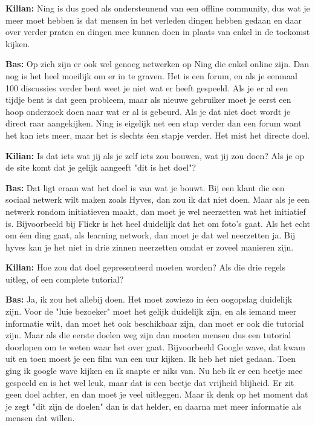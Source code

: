 \textbf{Kilian:} Ning is dus goed als ondersteunend van een offline community, dus wat je meer moet hebben is dat mensen in het verleden dingen hebben gedaan en daar over verder praten en dingen mee kunnen doen in plaats van enkel in de toekomst kijken.

\textbf{Bas:} Op zich zijn er ook wel genoeg netwerken op Ning die enkel online zijn. Dan nog is het heel moeilijk om er in te graven. Het is een forum, en als je eenmaal 100 discussies verder bent weet je niet wat er heeft gespeeld. Als je er al een tijdje bent is dat geen probleem, maar als nieuwe gebruiker moet je eerst een hoop onderzoek doen naar wat er al is gebeurd. Als je dat niet doet wordt je direct raar aangekijken. Ning is eigelijk net een stap verder dan een forum want het kan iets meer, maar het is slechts éen stapje verder. Het mist het directe doel.

\textbf{Kilian:} Is dat iets wat jij als je zelf iets zou bouwen, wat jij zou doen? Als je op de site komt dat je gelijk aangeeft "dit is het doel"?

\textbf{Bas:} Dat ligt eraan wat het doel is van wat je bouwt. Bij een klant die een sociaal netwerk wilt maken zoals Hyves, dan zou ik dat niet doen. Maar als je een netwerk rondom initiatieven maakt, dan moet je wel neerzetten wat het initiatief is. Bijvoorbeeld bij Flickr is het heel duidelijk dat het om foto's gaat. Als het echt om éen ding gaat, als learning network, dan moet je dat wel neerzetten ja. Bij hyves kan je het niet in drie zinnen neerzetten omdat er zoveel manieren zijn.

\textbf{Kilian:} Hoe zou dat doel gepresenteerd moeten worden? Als die drie regels uitleg, of een complete tutorial?

\textbf{Bas:} Ja, ik zou het allebij doen. Het moet zowiezo in éen oogopslag duidelijk zijn. Voor de "luie bezoeker" moet het gelijk duidelijk zijn, en als iemand meer informatie wilt, dan moet het ook beschikbaar zijn, dan moet er ook die tutorial zijn. Maar als die eerste doelen weg zijn dan moeten mensen dus een tutorial doorlopen om te weten waar het over gaat. Bijvoorbeeld Google wave, dat kwam uit en toen moest je een film van een uur kijken. Ik heb het niet gedaan. Toen ging ik google wave kijken en ik snapte er niks van. Nu heb ik er een beetje mee gespeeld en is het wel leuk, maar dat is een beetje dat vrijheid blijheid. Er zit geen doel achter, en dan moet je veel uitleggen. Maar ik denk op het moment dat je zegt "dit zijn de doelen" dan is dat helder, en daarna met meer informatie als mensen dat willen.

